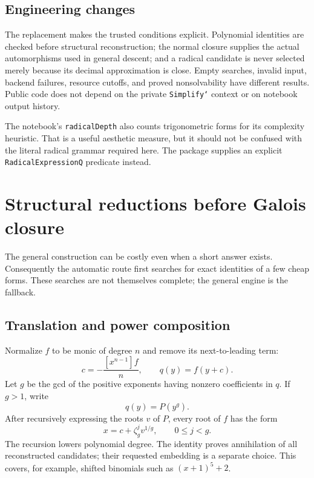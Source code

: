 \documentclass[11pt]{article}
\theoremstyle{definition}\newtheorem{definition}[theorem]{Definition}
\theoremstyle{remark}\newtheorem{remark}[theorem]{Remark}
\newcommand{\code}[1]{\texttt{#1}}
\begin{document}
\subsection{Engineering changes}

The replacement makes the trusted conditions explicit. Polynomial identities
are checked before structural reconstruction; the normal closure supplies the
actual automorphisms used in general descent; and a radical candidate is never
selected merely because its decimal approximation is close. Empty searches,
invalid input, backend failures, resource cutoffs, and proved nonsolvability
have different results. Public code does not depend on the private
\code{Simplify`} context or on notebook output history.

The notebook's \code{radicalDepth} also counts trigonometric forms for its
complexity heuristic. That is a useful aesthetic measure, but it should not be
confused with the literal radical grammar required here. The package supplies
an explicit \code{RadicalExpressionQ} predicate instead.

\section{Structural reductions before Galois closure}\label{sec:structural}

The general construction can be costly even when a short answer exists.
Consequently the automatic route first searches for exact identities of a few
cheap forms. These searches are not themselves complete; the general engine is
the fallback.

\subsection{Translation and power composition}

Normalize $f$ to be monic of degree $n$ and remove its next-to-leading term:
\begin{equation}
 c=-\frac{[x^{n-1}]f}{n},\qquad q(y)=f(y+c).
\end{equation}
Let $g$ be the gcd of the positive exponents having nonzero coefficients in
$q$. If $g>1$, write
\begin{equation}
 q(y)=P(y^g).
\end{equation}
After recursively expressing the roots $v$ of $P$, every root of $f$ has the
form
\begin{equation}\label{eq:powercomp}
 x=c+\zeta_g^j v^{1/g},\qquad 0\le j<g.
\end{equation}
The recursion lowers polynomial degree. The identity proves annihilation of
all reconstructed candidates; their requested embedding is a separate choice.
This covers, for example, shifted binomials such as $(x+1)^5+2$.
\end{document}
